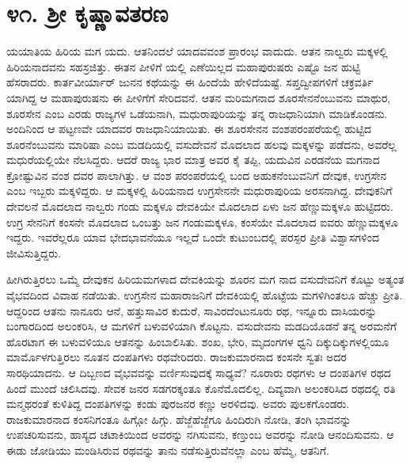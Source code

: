 
\chapter{೪೧. ಶ್ರೀ ಕೃಷ್ಣಾವತರಣ}

ಯಯಾತಿಯ ಹಿರಿಯ ಮಗ ಯದು. ಆತನಿಂದಲೆ ಯಾದವವಂಶ ಪ್ರಾರಂಭ ವಾದುದು. ಆತನ ನಾಲ್ವರು ಮಕ್ಕಳಲ್ಲಿ ಹಿರಿಯನಾದವನು ಸಹಸ್ರಜಿತ್ತು. ಈತನ ಪೀಳಿಗೆ ಯಲ್ಲಿ ಎಣೆಯಿಲ್ಲದ ಮಹಾಪುರುಷರು ಎಷ್ಟೊ ಜನ ಹುಟ್ಟಿ ಹೆಸರಾದರು. ಕಾರ್ತವೀರ್ಯಾರ್ ಜುನನ ಕಥೆಯನ್ನು ಈ ಹಿಂದೆಯೆ ಹೇಳಿದೆಯಷ್ಟೆ. ಸಪ್ತದ್ವೀಪಗಳಿಗೆ ಚಕ್ರವರ್ತಿ ಯಾಗಿದ್ದ ಆ ಮಹಾಪುರುಷನು ಈ ಪೀಳಿಗೆಗೆ ಸೇರಿದವನೆ. ಆತನ ಮರಿಮಗನಾದ ಶೂರಸೇನನೆಂಬುವನು ಮಾಥುರ, ಶೂರಸೇನ ಎಂಬ ಎರಡು ರಾಜ್ಯಗಳ ಒಡೆಯನಾಗಿ, ಮಧುರಾಪುರಿಯನ್ನು ತನ್ನ ರಾಜಧಾನಿಯಾಗಿ ಮಾಡಿಕೊಂಡನು. ಅಂದಿನಿಂದ ಆ ಪಟ್ಟಣವೇ ಯಾದವರ ರಾಜಧಾನಿಯಾಯಿತು. ಈ ಶೂರಸೇನನ ವಂಶಪರಂಪರೆಯಲ್ಲಿ ಹುಟ್ಟಿದ ಶೂರನೆಂಬುವನು ಮಾರಿಷಾ ಎಂಬ ಮಡದಿಯಲ್ಲಿ ವಸುದೇವನೆ ಮೊದಲಾದ ಹಲವು ಮಕ್ಕಳನ್ನು ಪಡೆದನು, ಅವರೆಲ್ಲ ಮಧುರೆಯಲ್ಲಿಯೇ ನೆಲಸಿದ್ದರು. ಆದರೆ ರಾಜ್ಯ ಭಾರ ಮಾತ್ರ ಅವರ ಕೈ ತಪ್ಪಿ, ಯದುವಿನ ಎರಡನೆಯ ಮಗನಾದ ಕ್ರೋಷ್ಟುವಿನ ವಂಶ ದವರ ಪಾಲಾಗಿತ್ತು. ಆ ವಂಶ ಪರಂಪರೆಯಲ್ಲಿ ಬಂದ ಅಹುಕನೆಂಬುವನಿಗೆ ದೇವುಕ, ಉಗ್ರಸೇನ ಎಂಬ ಇಬ್ಬರು ಮಕ್ಕಳಿದ್ದರು. ಆ ಮಕ್ಕಳಲ್ಲಿ ಹಿರಿಯನಾದ ಉಗ್ರಸೇನನೇ ಮಧುರಾಪುರಿಯ ಅರಸನಾಗಿದ್ದ. ದೇವುಕನಿಗೆ ದೇವಲನೆ ಮೊದಲಾದ ನಾಲ್ವರು ಗಂಡು ಮಕ್ಕಳೂ ದೇವಕಿಯೇ ಮೊದಲಾದ ಏಳು ಜನ ಹೆಣ್ಣುಮಕ್ಕಳೂ ಹುಟ್ಟಿದರು. ಉಗ್ರ ಸೇನನಿಗೆ ಕಂಸನೇ ಮೊದಲಾದ ಒಂಬತ್ತು ಜನ ಗಂಡುಮಕ್ಕಳೂ, ಕಂಸೆಯೇ ಮೊದಲಾದ ಐವರು ಹೆಣ್ಣುಮಕ್ಕಳೂ ಇದ್ದರು. ಇವರೆಲ್ಲರೂ ಯಾವ ಭೇದಭಾವನೆಯೂ ಇಲ್ಲದೆ ಒಂದೇ ಕುಟುಂಬದಲ್ಲಿ ಪರಸ್ಪರ ಪ್ರೀತಿ ವಿಶ್ವಾಸಗಳಿಂದ ಜೀವಿಸುತ್ತಿದ್ದರು.

ಹೀಗಿರುತ್ತಿರಲು ಒಮ್ಮೆ ದೇವುಕನ ಹಿರಿಯಮಗಳಾದ ದೇವಕಿಯನ್ನು ಶೂರನ ಮಗ ನಾದ ವಸುದೇವನಿಗೆ ಕೊಟ್ಟು ಅತ್ಯಂತ ವೈಭವದಿಂದ ವಿವಾಹ ನಡೆಯಿತು. ಉಗ್ರಸೇನ ಮಹಾರಾಜನಿಗೆ ದೇವಕಿಯಲ್ಲಿ ಹೊಟ್ಟೆಯ ಮಗಳಿಗಿಂತಲೂ ಹೆಚ್ಚು ಪ್ರೀತಿ. ಆದ್ದರಿಂದ ಆತನು ನಾನೂರು ಆನೆ, ಹತ್ತುಸಾವಿರ ಕುದುರೆ, ಸಾವಿರದೆಂಟುನೂರು ರಥ, ಇನ್ನೂರು ದಾಸಿಯರನ್ನು ಬಂಗಾರದಿಂದ ಅಲಂಕರಿಸಿ, ಆ ಮಗಳಿಗೆ ಬಳುವಳಿಯಾಗಿ ಕೊಟ್ಟನು. ವಸುದೇವನು ಮಡದಿಯೊಡನೆ ತನ್ನ ಅರಮನೆಗೆ ಹೊರಟಾಗ ಈ ಬಳುವಳಿಯೂ ಆತನನ್ನು ಹಿಂಬಾಲಿಸಿತು. ಶಂಖ, ಭೇರಿ, ಮೃದಂಗಗಳ ಧ್ವನಿ ದಿಕ್ಕುದಿಕ್ಕುಗಳಲ್ಲಿಯೂ ಮಾರ್ಮೊಳಗುತ್ತಿರಲು ನೂತನ ದಂಪತಿಗಳು ರಥವೇರಿದರು. ರಾಜಕುಮಾರನಾದ ಕಂಸನೇ ಸ್ವತಃ ಅದರ ಸಾರಥಿಯಾದನು. ಆ ದಿಬ್ಬಣದ ವೈಭವವನ್ನು ವರ್ಣಿಸುವುದಕ್ಕೆ ಸಾಧ್ಯವೆ? ನೂರಾರು ರಥಗಳು ಆ ದಂಪತಿಗಳ ರಥದ ಹಿಂದೆ ಮುಂದೆ ಚಲಿಸಿದವು. ಸೇವಕ ಜನರ ಸಡಗರಕ್ಕಂತೂ ಕೊನೆಮೊದಲಿಲ್ಲ. ದಿವ್ಯವಾಗಿ ಅಲಂಕರಿಸಿದ ರಥದಲ್ಲಿ ರತಿ ಮನ್ಮಥರಂತೆ ಕುಳಿತಿದ್ದ ದಂಪತಿಗಳನ್ನು ಕಂಡು ಪುರಜನರ ಕಣ್ಣು ಅರಳಿದವು. ಅವರು ಪುಲಕಗೊಂಡರು. ರಾಜಕುಮಾರನಾದ ಕಂಸನಿಗಂತೂ ಹಿಗ್ಗೋ ಹಿಗ್ಗು. ಹೆಜ್ಜೆಹೆಜ್ಜೆಗೂ ಹಿಂದಿರುಗಿ ನೋಡಿ, ತಂಗಿ ಭಾವನನ್ನು ಉಪಚರಿಸುವನು, ಹಾಸ್ಯದ ಚಟಾಕಿಯಿಂದ ಅವರನ್ನು ನಗಿಸುವನು, ಕಣ್ತುಂಬ ಅವರನ್ನು ನೋಡಿ ಆನಂದಿಸುವನು. ಆ ಈಡು ಜೋಡಿಯು ಮಂಡಿಸಿರುವ ರಥವನ್ನು ತಾನು ನಡೆಸುತ್ತಿರುವೆನಲ್ಲಾ ಎಂಬ ಹೆಮ್ಮೆ, ಆತನಿಗೆ.


